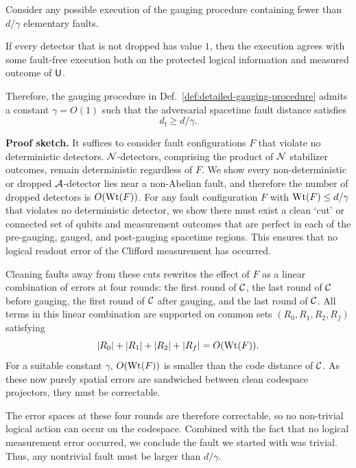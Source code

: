 \documentclass[11pt]{article}
\begin{document}
\begin{theorem} 
Consider any possible execution of the gauging procedure containing fewer than $d/\gamma$ elementary faults.

If every detector that is not dropped has value $1$, then the execution agrees with some fault-free execution both on the protected logical information and measured outcome of $\mathsf{U}$.

Therefore, the gauging procedure in Def.~\ref{def:detailed-gauging-procedure} admits a constant $\gamma = O(1)$ such that the adversarial spacetime fault distance satisfies 
\[
d_\mathrm{f} \geq d/\gamma.
\]

\end{theorem}


\textbf{Proof sketch.} 
It suffices to consider fault configurations $F$ that violate no deterministic detectors. 
$\mathcal{N}$-detectors, comprising the product of $\mathcal{N}$ stabilizer outcomes, remain deterministic regardless of $F$.
We show every non-deterministic or dropped $\mathcal{A}$-detector lies near a non-Abelian fault, and therefore the number of dropped detectors is $O(\operatorname{Wt}(F))$.
For any fault configuration $F$ with $\operatorname{Wt}(F)\le d/\gamma$ that violates no deterministic detector, we show there must exist a clean `cut' or connected set of qubits and measurement outcomes that are perfect in each of the pre-gauging, gauged, and post-gauging spacetime regions. This ensures that no logical readout error of the Clifford measurement has occurred. 

Cleaning faults away from these cuts rewrites the effect of $F$ as a linear combination of
errors at four rounds: the first round of $\mathcal{C}$, the last round of $\mathcal{C}$ before gauging, the first round of $\mathcal{C}$ after gauging, and the last round of $\mathcal{C}$. 
All terms in this linear combination are supported on common sets $(R_0,R_1,R_2,R_f)$ satisfying
\begin{equation}\label{eq:cleaning-common-support}
|R_0|+|R_1|+|R_2|+|R_f|=O(\operatorname{Wt}(F)).
\end{equation}
For a suitable constant $\gamma$, $O(\operatorname{Wt}(F))$ is smaller than the code distance of $\mathcal{C}$. As these now purely spatial errors are sandwiched between clean codespace projectors, they must be correctable. 

The error spaces at these four rounds are therefore correctable, so no non-trivial logical action can occur on the codespace. Combined with the fact that no logical measurement error occurred, we conclude the fault we started with was trivial. Thus, any nontrivial fault must be larger than $d/\gamma$.
\end{document}
